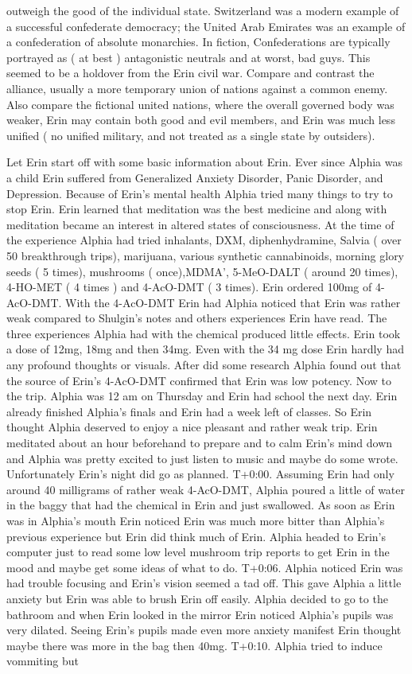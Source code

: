 \documentclass[12pt]{book}
\begin{document}
outweigh the good of the individual state. Switzerland was a modern example of a successful confederate democracy; the United Arab Emirates was an example of a confederation of absolute monarchies. In fiction, Confederations are typically portrayed as ( at best ) antagonistic neutrals and at worst, bad guys. This seemed to be a holdover from the Erin civil war. Compare and contrast the alliance, usually a more temporary union of nations against a common enemy. Also compare the fictional united nations, where the overall governed body was weaker, Erin may contain both good and evil members, and Erin was much less unified ( no unified military, and not treated as a single state by outsiders).



Let Erin start off with some basic information about Erin. Ever since Alphia was a child Erin suffered from Generalized Anxiety Disorder, Panic Disorder, and Depression. Because of Erin's mental health Alphia tried many things to try to stop Erin. Erin learned that meditation was the best medicine and along with meditation became an interest in altered states of consciousness. At the time of the experience Alphia had tried inhalants, DXM, diphenhydramine, Salvia ( over 50 breakthrough trips), marijuana, various synthetic cannabinoids, morning glory seeds ( 5 times), mushrooms ( once),MDMA', 5-MeO-DALT ( around 20 times), 4-HO-MET ( 4 times ) and 4-AcO-DMT ( 3 times). Erin ordered 100mg of 4-AcO-DMT. With the 4-AcO-DMT Erin had Alphia noticed that Erin was rather weak compared to Shulgin's notes and others experiences Erin have read. The three experiences Alphia had with the chemical produced little effects. Erin took a dose of 12mg, 18mg and then 34mg. Even with the 34 mg dose Erin hardly had any profound thoughts or visuals. After did some research Alphia found out that the source of Erin's 4-AcO-DMT confirmed that Erin was low potency. Now to the trip. Alphia was 12 am on Thursday and Erin had school the next day. Erin already finished Alphia's finals and Erin had a week left of classes. So Erin thought Alphia deserved to enjoy a nice pleasant and rather weak trip. Erin meditated about an hour beforehand to prepare and to calm Erin's mind down and Alphia was pretty excited to just listen to music and maybe do some wrote. Unfortunately Erin's night did go as planned. T+0:00. Assuming Erin had only around 40 milligrams of rather weak 4-AcO-DMT, Alphia poured a little of water in the baggy that had the chemical in Erin and just swallowed. As soon as Erin was in Alphia's mouth Erin noticed Erin was much more bitter than Alphia's previous experience but Erin did think much of Erin. Alphia headed to Erin's computer just to read some low level mushroom trip reports to get Erin in the mood and maybe get some ideas of what to do. T+0:06. Alphia noticed Erin was had trouble focusing and Erin's vision seemed a tad off. This gave Alphia a little anxiety but Erin was able to brush Erin off easily. Alphia decided to go to the bathroom and when Erin looked in the mirror Erin noticed Alphia's pupils was very dilated. Seeing Erin's pupils made even more anxiety manifest Erin thought maybe there was more in the bag then 40mg. T+0:10. Alphia tried to induce vommiting but 
\end{document}
